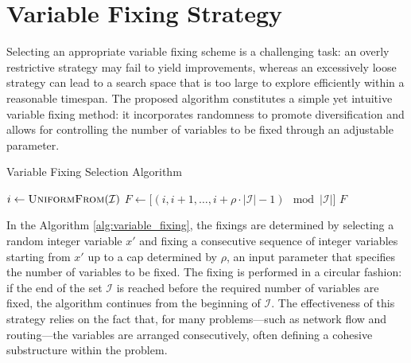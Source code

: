 \section{Variable Fixing Strategy}\label{sec:PACS_var_fix}
Selecting an appropriate variable fixing scheme is a challenging task: an overly restrictive strategy may fail to yield improvements, whereas an excessively loose strategy can lead to a search space that is too large to explore efficiently within a reasonable timespan.
The proposed algorithm constitutes a simple yet intuitive variable fixing method: it incorporates randomness to promote diversification and allows for controlling the number of variables to be fixed through an adjustable parameter.
\begin{algorithm}
\caption{Variable Fixing Selection Algorithm}\label{alg:variable_fixing}
\begin{algorithmic}[1]
    \State $i \gets \Call{UniformFrom}{\mathcal{I}}$
    \State $F \gets \big[(i,i+1,\dots,i+\rho\cdot|\mathcal{I}| -1) \mod |\mathcal{I}|\big]$
    \State \Return $F$
\EndFunction
\end{algorithmic}
\end{algorithm}
In the Algorithm \ref{alg:variable_fixing}, the fixings are determined by selecting a random integer variable $x'$ and fixing a consecutive sequence of integer variables starting from $x'$ up to a cap determined by $\rho$, an input parameter that specifies the number of variables to be fixed.
The fixing is performed in a circular fashion: if the end of the set $\mathcal{I}$ is reached before the required number of variables are fixed, the algorithm continues from the beginning of $\mathcal{I}$.
The effectiveness of this strategy relies on the fact that, for many problems—such as network flow and routing—the variables are arranged consecutively, often defining a cohesive substructure within the problem.